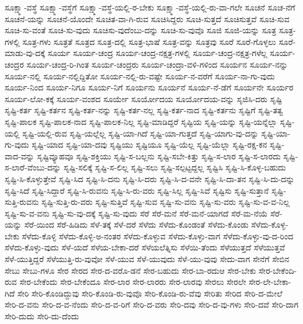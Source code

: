 {ಸೂಕ್ಷ್ಮಾ-ವಸ್ಥೆ
ಸೂಕ್ಷ್ಮಾ-ವಸ್ಥೆಗೆ
ಸೂಕ್ಷ್ಮಾ-ವಸ್ಥೆ-ಯಲ್ಲಿ-ರ-ಬೇಕು
ಸೂಕ್ಷ್ಮಾ-ವಸ್ಥೆ-ಯಲ್ಲಿ-ರು-ವಾ-ಗಲೇ
ಸೂಚನೆ
ಸೂಚ-ನೆಗೆ
ಸೂಚನೆ-ಯನ್ನು
ಸೂಚನೆ-ಯೊಂದೇ
ಸೂಚಿತ-ವಾ-ಗಿ-ರುವ
ಸೂಚಿಸಿದ್ದರು
ಸೂಚಿ-ಸುತ್ತದೆ
ಸೂಚಿಸುತ್ತವೆ
ಸೂಚಿ-ಸುವ
ಸೂಚಿ-ಸು-ವಂತೆ
ಸೂಚಿ-ಸು-ವುದು
ಸೂಚಿಸು-ವುದೆಂಬು-ದನ್ನು
ಸೂಚಿ-ಸು-ವುವೊ
ಸೂಜಿ
ಸೂಜಿ-ಯನ್ನು
ಸೂತ್ರ
ಸೂತ್ರ-ಗಳಲ್ಲಿ
ಸೂತ್ರ-ಗಳು
ಸೂತ್ರತೆ
ಸೂತ್ರದ
ಸೂತ್ರ-ದಲ್ಲಿ
ಸೂತ್ರ-ಭಾಷೆ
ಸೂತ್ರ-ವನ್ನು
ಸೂತ್ರವು
ಸೂರೆ
ಸೂರೆ-ಗೊಳ್ಳಲು
ಸೂರೆ-ಮಾಡು-ವು-ದಕ್ಕೆ
ಸೂರ್ಯ
ಸೂರ್ಯ-ಚಂದ್ರ
ಸೂರ್ಯ-ಚಂದ್ರ-ನಕ್ಷತ್ರ-ಗಳಲ್ಲಿ
ಸೂರ್ಯ-ಚಂದ್ರ-ನಕ್ಷತ್ರ-ಗಳೆಲ್ಲ
ಸೂರ್ಯ-ಚಂದ್ರರ
ಸೂರ್ಯ-ಚಂದ್ರ-ರಿ-ಗಿಂತ
ಸೂರ್ಯ-ಚಂದ್ರರು
ಸೂರ್ಯ-ಚಂದ್ರಾ-ವಳಿ-ಗಳಿಂದ
ಸೂರ್ಯನ
ಸೂರ್ಯ-ನನ್ನು
ಸೂರ್ಯ-ನಲ್ಲಿ
ಸೂರ್ಯ-ನಲ್ಲಿದ್ದಿತೋ
ಸೂರ್ಯ-ನಲ್ಲಿ-ರು-ವಷ್ಟೇ
ಸೂರ್ಯ-ನ-ವರೆಗೆ
ಸೂರ್ಯ-ನಾ-ಗು-ವುದು
ಸೂರ್ಯ-ನಿಂದ
ಸೂರ್ಯ-ನಿಗೂ
ಸೂರ್ಯ-ನಿಗೆ
ಸೂರ್ಯನು
ಸೂರ್ಯನೆ
ಸೂರ್ಯ-ನೆ-ಡೆಗೆ
ಸೂರ್ಯನೇ
ಸೂರ್ಯರ
ಸೂರ್ಯ-ಲೋ-ಕಕ್ಕೆ
ಸೂರ್ಯ-ವಂಶದ
ಸೂರ್ಯೇ
ಸೂರ್ಯೋದಯ
ಸೂರ್ಯೋದಯ-ವನ್ನು
ಸೃಜಿಸಿ-ದರು
ಸೃಷ್ಟಿ
ಸೃಷ್ಟಿ-ಕರ್ತ
ಸೃಷ್ಟಿ-ಕರ್ತನ
ಸೃಷ್ಟಿ-ಕರ್ತ-ನನ್ನು
ಸೃಷ್ಟಿ-ಕರ್ತ-ನಲ್ಲ
ಸೃಷ್ಟಿ-ಕರ್ತ-ನಾದ
ಸೃಷ್ಟಿ-ಕರ್ತನು
ಸೃಷ್ಟಿಗೆ
ಸೃಷ್ಟಿ-ತತ್ವ
ಸೃಷ್ಟಿ-ಪಾಲಕ
ಸೃಷ್ಟಿ-ಪಾಲಕ-ನಾದ
ಸೃಷ್ಟಿ-ಪಾಲಕ-ನಿಲ್ಲ
ಸೃಷ್ಟಿ-ಮಾಡಿದ್ದರೆ
ಸೃಷ್ಟಿಯ
ಸೃಷ್ಟಿ-ಯನ್ನು
ಸೃಷ್ಟಿ-ಯನ್ನೆಲ್ಲಾ
ಸೃಷ್ಟಿ-ಯಲ್ಲಿ
ಸೃಷ್ಟಿ-ಯಲ್ಲಿ-ರುವ
ಸೃಷ್ಟಿ-ಯಲ್ಲೆಲ್ಲ
ಸೃಷ್ಟಿ-ಯಾ-ಗಿದೆ
ಸೃಷ್ಟಿ-ಯಾ-ಗುತ್ತದೆ
ಸೃಷ್ಟಿ-ಯಾಗು-ವು-ದನ್ನು
ಸೃಷ್ಟಿ-ಯಾ-ಗು-ವುದು
ಸೃಷ್ಟಿ-ಯಾದ
ಸೃಷ್ಟಿ-ಯಾ-ದವು
ಸೃಷ್ಟಿಯು
ಸೃಷ್ಟಿಯೂ
ಸೃಷ್ಟಿ-ಯೆಲ್ಲ
ಸೃಷ್ಟಿ-ಯೆಲ್ಲಾ
ಸೃಷ್ಟಿ-ರಕ್ಷ-ಕನ
ಸೃಷ್ಟಿ-ವಾದ-ವನ್ನು
ಸೃಷ್ಟಿವ್ಯೂಹವೂ
ಸೃಷ್ಟಿ-ಶಕ್ತಿಯು
ಸೃಷ್ಟಿ-ಸ-ಬಲ್ಲನು
ಸೃಷ್ಟಿ-ಸಬೇ-ಕಿತ್ತು
ಸೃಷ್ಟಿ-ಸ-ಲಾರ
ಸೃಷ್ಟಿ-ಸ-ಲಾರದು
ಸೃಷ್ಟಿ-ಸ-ಲಾರೆ-ವೆಂಬು-ದನ್ನು
ಸೃಷ್ಟಿ-ಸಲಿಕ್ಕೆ
ಸೃಷ್ಟಿ-ಸ-ಲಿಲ್ಲ
ಸೃಷ್ಟಿ-ಸಲು
ಸೃಷ್ಟಿ-ಸಲ್ಪಟ್ಟದ್ದಲ್ಲ
ಸೃಷ್ಟಿಸಿ
ಸೃಷ್ಟಿ-ಸಿ-ಕೊಳ್ಳ-ಬಹುದು
ಸೃಷ್ಟಿ-ಸಿ-ಕೊಳ್ಳುತ್ತೇವೆ
ಸೃಷ್ಟಿ-ಸಿದ
ಸೃಷ್ಟಿ-ಸಿ-ದನು
ಸೃಷ್ಟಿ-ಸಿ-ದರು
ಸೃಷ್ಟಿ-ಸಿ-ದ-ವನೇ
ಸೃಷ್ಟಿ-ಸಿ-ದಾ-ತನ
ಸೃಷ್ಟಿ-ಸಿ-ದು-ದನ್ನು
ಸೃಷ್ಟಿ-ಸಿದೆ
ಸೃಷ್ಟಿ-ಸಿದ್ದಾರೆ
ಸೃಷ್ಟಿ-ಸಿ-ರುವನು
ಸೃಷ್ಟಿ-ಸಿ-ರು-ವರು
ಸೃಷ್ಟಿ-ಸಿಲ್ಲ
ಸೃಷ್ಟಿ-ಸಿವೆ
ಸೃಷ್ಟಿಸು
ಸೃಷ್ಟಿ-ಸುತ್ತಾನೆ
ಸೃಷ್ಟಿ-ಸುತ್ತಿ-ರುವನು
ಸೃಷ್ಟಿ-ಸುತ್ತಿ-ರು-ವರು
ಸೃಷ್ಟಿ-ಸುತ್ತಿವೆ
ಸೃಷ್ಟಿ-ಸುವ
ಸೃಷ್ಟಿ-ಸು-ವನು
ಸೃಷ್ಟಿ-ಸು-ವರು
ಸೃಷ್ಟಿ-ಸು-ವ-ವ-ನಿಲ್ಲ
ಸೃಷ್ಟಿ-ಸು-ವ-ವನು
ಸೃಷ್ಟಿ-ಸು-ವು-ದಕ್ಕೆ
ಸೃಷ್ಟಿ-ಸು-ವುದು
ಸೆರೆ
ಸೆರೆ-ಮನೆ
ಸೆರೆ-ಮನೆ-ಯಾಗದೆ
ಸೆರೆ-ಮ-ನೆಯೆ
ಸೆರೆ-ಯನ್ನು
ಸೆರೆ-ಯಿಂದ
ಸೆರೆ-ಹಿಡಿದು
ಸೆಳೆ-ತಕ್ಕೆ
ಸೆಳೆ-ದರೆ
ಸೆಳೆದು
ಸೆಳೆದು-ಕೊಂಡಂತೆ
ಸೆಳೆದು-ಕೊಂಡು
ಸೆಳೆದು-ಕೊಳ್ಳ-ಬೇಕು
ಸೆಳೆದು-ಕೊಳ್ಳಿ
ಸೆಳೆದು-ಕೊಳ್ಳಿ-ಅ-ನಂತರ
ಸೆಳೆದು-ಕೊಳ್ಳುವ
ಸೆಳೆದು-ಕೊಳ್ಳು-ವಾಗ
ಸೆಳೆದು-ಕೊಳ್ಳು-ವು-ದ-ರಿಂದ
ಸೆಳೆದು-ಕೊಳ್ಳು-ವುದು
ಸೆಳೆ-ಯದೆ
ಸೆಳೆಯ-ಬೇಕಾ-ದರೆ
ಸೆಳೆಯಲೆತ್ನಿಸು
ಸೆಳೆಯಿ-ತೆಂದು
ಸೆಳೆಯುತ್ತದೆ
ಸೆಳೆಯುತ್ತವೆ
ಸೆಳೆ-ಯುತ್ತಿದ್ದರೆ
ಸೆಳೆಯುತ್ತಿ-ರು-ವುವೋ
ಸೆಳೆ-ಯುವ
ಸೆಳೆ-ಯುವುದು
ಸೆಳೆ-ಯು-ವುವು
ಸೇದು-ವಾಗ
ಸೇನೆಗೆ
ಸೇಬಿನ
ಸೇಬು
ಸೇಬು-ಗಳೂ
ಸೇರ
ಸೇರದ
ಸೇರ-ದ-ವರೊ-ಡನೆ
ಸೇರ-ಬಹುದು
ಸೇರ-ಬಾ-ರದುಆ
ಸೇರ-ಬೇಕು
ಸೇರ-ಬೇಕೆಂದಿ-ರುವ
ಸೇರ-ಬೇಕೆಂದು
ಸೇರ-ಬೇಕೆಂದೂ
ಸೇರ-ಲಾರ
ಸೇರ-ಲಾರರು
ಸೇರ-ಲಾರವು
ಸೇರಲು
ಸೇರಲೇ
ಸೇರ-ಲೇ-ಬೇಕಾ-ಗಿದೆ
ಸೇರಿ
ಸೇರಿ-ಕೊಂಡಿದ್ದುವು
ಸೇರಿ-ಕೊಂಡಿ-ರು-ವುವೊ
ಸೇರಿ-ಕೊಂಡಿ-ರು-ವೆವು
ಸೇರಿತು
ಸೇರಿದ
ಸೇರಿ-ದ-ಮೇಲೆ
ಸೇರಿ-ದ-ವನು
ಸೇರಿ-ದ-ವ-ನೆಂದು
ಸೇರಿ-ದ-ವ-ರಿಗೆ
ಸೇರಿ-ದ-ವರು
ಸೇರಿ-ದವು
ಸೇರಿ-ದ-ವು-ಗಳು
ಸೇರಿ-ದವೆ
ಸೇರಿ-ದಾಗ
ಸೇರಿ-ದುದು
ಸೇರಿ-ದು-ದೆಂದು
}
